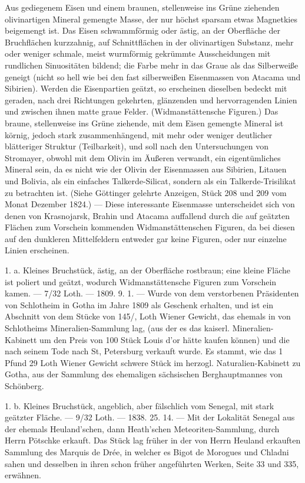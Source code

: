 \documentclass[a4paper, 11pt, oneside, polutonikogreek, german]{article}
\begin{document}
Aus gediegenem Eisen und einem braunen, stellenweise ins Grüne ziehenden olivinartigen Mineral gemengte Masse, der nur höchst sparsam etwas Magnetkies beigemengt ist. Das Eisen schwammförmig oder ästig, an der Oberfläche der Bruchflächen kurzzahnig, auf Schnittflächen in der olivinartigen Substanz, mehr oder weniger schmale, meist wurmförmig gekrümmte Ausscheidungen mit rundlichen Sinuositäten bildend; die Farbe mehr in das Graue als das Silberweiße geneigt (nicht so hell wie bei den fast silberweißen Eisenmassen von Atacama und Sibirien). Werden die Eisenpartien geätzt, so erscheinen dieselben bedeckt mit geraden, nach drei Richtungen gekehrten, glänzenden und hervorragenden Linien und zwischen ihnen matte graue Felder. (Widmanstättensche Figuren.) Das braune, stellenweise ins Grüne ziehende, mit dem Eisen gemengte Mineral ist körnig, jedoch stark zusammenhängend, mit mehr oder weniger deutlicher blätteriger Struktur (Teilbarkeit), und soll nach den Untersuchungen von Stromayer, obwohl mit dem Olivin im Äußeren verwandt, ein eigentümliches Mineral sein, da es nicht wie der Olivin der Eisenmassen aus Sibirien, Litauen und Bolivia, als ein einfaches Talkerde-Silicat, sondern als ein Talkerde-Trisilikat zu betrachten ist. (Siehe Göttinger gelehrte Anzeigen, Stück 208 und 209 vom Monat Dezember 1824.) — Diese interessante Eisenmasse unterscheidet sich von denen von Krasnojarsk, Brahin und Atacama auffallend durch die auf geätzten Flächen zum Vorschein kommenden Widmanstättenschen Figuren, da bei diesen auf den dunkleren Mittelfeldern entweder gar keine Figuren, oder nur einzelne Linien erscheinen.

1. a. Kleines Bruchstück, ästig, an der Oberfläche rostbraun; eine kleine Fläche ist poliert und geätzt, wodurch Widmanstättensche Figuren zum Vorschein kamen. — 7/32 Loth. — 1809. 9. 1. — Wurde von dem verstorbenen Präsidenten von Schlotheim in Gotha im Jahre 1809 als Geschenk erhalten, und ist ein Abschnitt von dem Stücke von 145/, Loth Wiener Gewicht, das ehemals in von Schlotheims Mineralien-Sammlung lag, (aus der es das kaiserl. Mineralien-Kabinett um den Preis von 100 Stück Louis d'or hätte kaufen können) und die nach seinem Tode nach St, Petersburg verkauft wurde. Es stammt, wie das 1 Pfund 29 Loth Wiener Gewicht schwere Stück im herzogl. Naturalien-Kabinett zu Gotha, aus der Sammlung des ehemaligen sächsischen Berghauptmannes von Schönberg.

1. b. Kleines Bruchstück, angeblich, aber fälschlich vom Senegal, mit stark geätzter Fläche. — 9/32 Loth. — 1838. 25. 14. — Mit der Lokalität Senegal aus der ehemals Heuland'schen, dann Heath'schen Meteoriten-Sammlung, durch Herrn Pötschke erkauft. Das Stück lag früher in der von Herrn Heuland erkauften Sammlung des Marquis de Drée, in welcher es Bigot de Morogues und Chladni sahen und desselben in ihren schon früher angeführten Werken, Seite 33 und 335, erwähnen.
\end{document}
